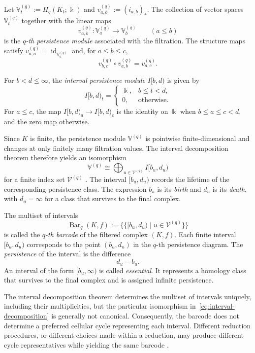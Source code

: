 \documentclass[11pt]{article}
\theoremstyle{paperdefinition}
\theoremstyle{paperplain}
\theoremstyle{paperremark}
\begin{document}
Let $\mathbb V_t^{(q)} := H_q(K_t;\Bbbk)$ and $v_{a,b}^{(q)} := (i_{a,b})_*$. The collection of vector spaces $\mathbb V_t^{(q)}$ together with the linear maps
\[
v_{a,b}^{(q)}: \mathbb V_a^{(q)} \longrightarrow \mathbb V_b^{(q)} \qquad(a\leq b)
\]
is the \emph{$q$-th persistence module} associated with the filtration. The structure maps satisfy $v_{a,a}^{(q)} = \operatorname{id}_{\mathbb V_a^{(q)}}$ and, for $a\leq b\leq c$,
\[
v_{b,c}^{(q)} \circ v_{a,b}^{(q)} = v_{a,c}^{(q)}.
\]

For $b<d\leq\infty$, the \emph{interval persistence module} $I[b,d)$ is given by
\[
I[b,d)_t =
\begin{cases}
\Bbbk,&b\leq t<d,\\
0,&\text{otherwise}.
\end{cases}
\]
For $a \leq c$, the map $I[b, d)_a \to I[b, d)_c$ is the identity on $\Bbbk$ when $b \leq a \leq c < d$, and the zero map otherwise. 

Since $K$ is finite, the persistence module $\mathbb V^{(q)}$ is pointwise finite-dimensional and changes at only finitely many filtration values. The interval decomposition theorem therefore yields an isomorphism
\begin{equation}
\label{eq:interval-decomposition}
\mathbb V^{(q)} \cong \bigoplus_{u\in\mathcal V^{(q)}}I[b_u,d_u)
\end{equation}
for a finite index set $\mathcal V^{(q)}$ \cite{zomorodian2005computing,crawleyboevey2015decomposition}. The interval $[b_u, d_u)$ records the lifetime of the corresponding persistence class. The expression $b_u$ is its \emph{birth} and $d_u$ is its \emph{death}, with $d_u = \infty$ for a class that survives to the final complex.

The multiset of intervals
\[
\operatorname{Bar}_q(K,f) := \bigl\{\!\bigl\{[b_u,d_u)\mid u\in\mathcal V^{(q)}\bigr\}\!\bigr\}
\]
is called the \emph{$q$-th barcode} of the filtered complex $(K,f)$. Each finite interval $[b_u,d_u)$ corresponds to the point $(b_u,d_u)$ in the $q$-th persistence diagram. The \emph{persistence} of the interval is the difference
\[
d_u-b_u.
\]
An interval of the form $[b_u,\infty)$ is called \emph{essential}. It represents a homology class that survives to the final complex and is assigned infinite persistence.

The interval decomposition theorem determines the multiset of intervals uniquely, including their multiplicities, but the particular isomorphism in~\eqref{eq:interval-decomposition} is generally not canonical. Consequently, the barcode does not determine a preferred cellular cycle representing each interval. Different reduction procedures, or different choices made within a reduction, may produce different cycle representatives while yielding the same barcode \cite{hang2021umatch}.
\end{document}
